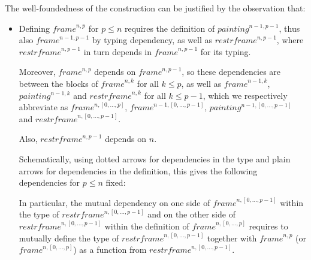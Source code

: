 \documentclass{article}
\newcommand{\myframe}{\mathit{frame}}
\newcommand{\painting}{\mathit{painting}}
\newcommand{\restrframe}{\mathit{restrframe}}
\begin{document}
The well-foundedness of the construction can be justified by the observation that:
\begin{itemize}
  \item Defining $\myframe^{n,p}$ for $p \leq n$ requires the definition
        of $\painting^{n-1,p-1}$, thus also $\myframe^{n-1,p-1}$ by typing
        dependency, as well as $\restrframe^{n,p-1}$, where
        $\restrframe^{n,p-1}$ in turn depends in $\myframe^{n,p-1}$ for its
        typing.

        Moreover, $\myframe^{n,p}$ depends on $\myframe^{n,p-1}$, so these
        dependencies are between the blocks of $\myframe^{n,k}$ for all
        $k\leq p$, as well as $\myframe^{n-1,k}$, $\painting^{n-1,k}$ and
        $\restrframe^{n,k}$ for all $k\leq p-1$, which we respectively
        abbreviate as $\myframe^{n,[0,...,p]}$,
        $\myframe^{n-1,[0,...,p-1]}$, $\painting^{n-1,[0,...,p-1]}$ and
        $\restrframe^{n,[0,...,p-1]}$.

        Also, $\restrframe^{n,p-1}$ depends on $n$.

        Schematically, using dotted arrows for dependencies in
        the type and plain arrows for dependencies in the definition, this
        gives the following dependencies for $p\leq n$ fixed:
        \begin{center}
        \end{center}

        In particular, the mutual dependency on one side of
        $\myframe^{n,[0,...,p-1]}$ within the type of
        $\restrframe^{n,[0,...,p-1]}$ and on the other side of
        $\restrframe^{n,[0,...,p-1]}$ within the definition of
        $\myframe^{n,[0,...,p]}$ requires to mutually define the type of
        $\restrframe^{n,[0,...,p-1]}$ together with $\myframe^{n,p}$ (or
        $\myframe^{n,[0,...,p]}$) as a function from
        $\restrframe^{n,[0,...,p-1]}$.


\end{itemize}
\end{document}

